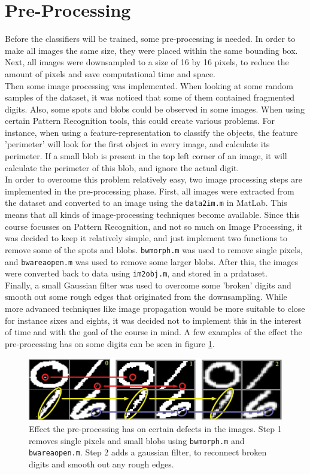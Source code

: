\section{Pre-Processing}
\label{sec:ImPros}
Before the classifiers will be trained, some pre-processing is needed. In order to make all images the same size, they were placed within the same bounding box. Next, all images were downsampled to a size of 16 by 16 pixels, to reduce the amount of pixels and save computational time and space. \\
Then some image processing was implemented. When looking at some random samples of the dataset, it was noticed that some of them contained fragmented digits. Also, some spots and blobs could be observed in some images. When using certain Pattern Recognition tools, this could create various problems. For instance, when using a feature-representation to classify the objects, the feature 'perimeter' will look for the first object in every image, and calculate its perimeter. If a small blob is present in the top left corner of an image, it will calculate the perimeter of this blob, and ignore the actual digit. \\
In order to overcome this problem relatively easy, two image processing steps are implemented in the pre-processing phase. First, all images were extracted from the dataset and converted to an image using the \texttt{data2im.m} in MatLab. This means that all kinds of image-processing techniques become available. Since this course focusses on Pattern Recognition, and not so much on Image Processing, it was decided to keep it relatively simple, and just implement two functions to remove some of the spots and blobs. \texttt{bwmorph.m} was used to remove single pixels, and \texttt{bwareaopen.m} was used to remove some larger blobs. After this, the images were converted back to data using \texttt{im2obj.m}, and stored in a prdataset. \\
Finally, a small Gaussian filter was used to overcome some 'broken' digits and smooth out some rough edges that originated from the downsampling. While more advanced techniques like image propagation would be more suitable to close for instance sixes and eights, it was decided not to implement this in the interest of time and with the goal of the course in mind. A few examples of the effect the pre-processing has on some digits can be seen in figure \ref{fig:Image_Prepros}.
\begin{figure}[H]
	\centering
	\includegraphics[scale=0.45]{images/Image_Prepros.jpg}
	\caption{Effect the pre-processing has on certain defects in the images. Step 1 removes single pixels and small blobs using \texttt{bwmorph.m} and \texttt{bwareaopen.m}. Step 2 adds a gaussian filter, to reconnect broken digits and smooth out any rough edges.}
	\label{fig:Image_Prepros}
\end{figure}